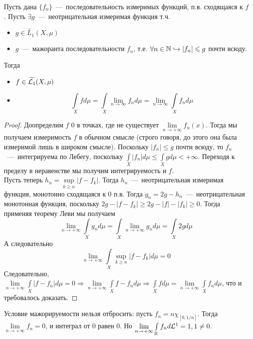 \begin{theorem}
    Пусть дана $\{f_n\}$~---~последовательность измеримых функций, п.в. сходящаяся к $f$. Пусть $\exists g$~---~неотрицательная измеримая функция т.ч. 
    \begin{itemize}
        \item $g \in \widetilde{L_1}(X, \mu)$
        \item $g$~---~мажоранта последовательности $f_n$, т.е. $\forall n \in \mathbb{N} \hookrightarrow |f_n| \leqslant g$ почти всюду.
    \end{itemize}
    Тогда 
    \begin{itemize}
        \item $f \in \widetilde{\mathcal{L}_1}(X, \mu)$
        \item \[
    \int\limits_X f d \mu = \int\limits_X \lim\limits_{n \to \infty} f_n d \mu = \lim\limits_{n \to \infty} \int\limits_X f_n d \mu
    \]
    \end{itemize}

\end{theorem}
\begin{proof}
    Доопределим $f$ 0 в точках, где не существует $\lim\limits_{n \rightarrow +\infty} f_n(x)$. Тогда мы получаем измеримость $f$ в обычном смысле (строго говоря, до этого она была измеримой лишь в широком смысле). Поскольку $|f_n| \leq g$ почти всюду, то $f_n$~---~интегрируема по Лебегу, поскольку $\int\limits_X |f_n|d\mu \leq \int\limits_X gd\mu < +\infty$. Переходя к пределу в неравенстве мы получим интегрируемость и $f$. \\ Пусть теперь $h_n = \sup\limits_{k \geq n} |f - f_k|$. Тогда $h_n$~---~неотрицательная измеримая функция, монотонно сходящаяся к 0 п.в. Тогда $g_n = 2g - h_n$~---~неотрицательная монотонная функция, поскольку $2g - |f - f_k| \geq 2g - |f| - |f_k| \geq 0$. Тогда применяя теорему Леви мы получаем \[\lim\limits_{n \rightarrow +\infty} \int\limits_X g_nd\mu = \int\limits_X \lim\limits_{n \rightarrow +\infty} g_nd\mu = \int\limits_X 2gd\mu\]
    А следовательно \[\lim\limits_{n \rightarrow +\infty} \int\limits_X \sup\limits_{k \geq n} |f - f_k|d\mu = 0\]
    Следовательно, $\lim\limits_{n \rightarrow +\infty} \int\limits_X |f - f_n|d\mu = 0 \Rightarrow \lim\limits_{n \rightarrow +\infty} \int\limits_X f - f_nd\mu \Rightarrow \int\limits_X fd\mu = \lim\limits_{n\rightarrow +\infty} \int\limits_X f_nd\mu$, что и требовалось доказать.
\end{proof}

\begin{note}
    Условие мажорируемости нельзя отбросить: пусть $f_n = n\chi_{[0, 1/n]}$. Тогда $\lim\limits_{n \rightarrow +\infty} f_n = 0$, и интеграл от 0 равен 0. Но $\lim\limits_{n \rightarrow +\infty} \int\limits_{\mathbb{R}} f_nd\mathcal{L}^1 = 1, 1 \neq 0$.
\end{note}